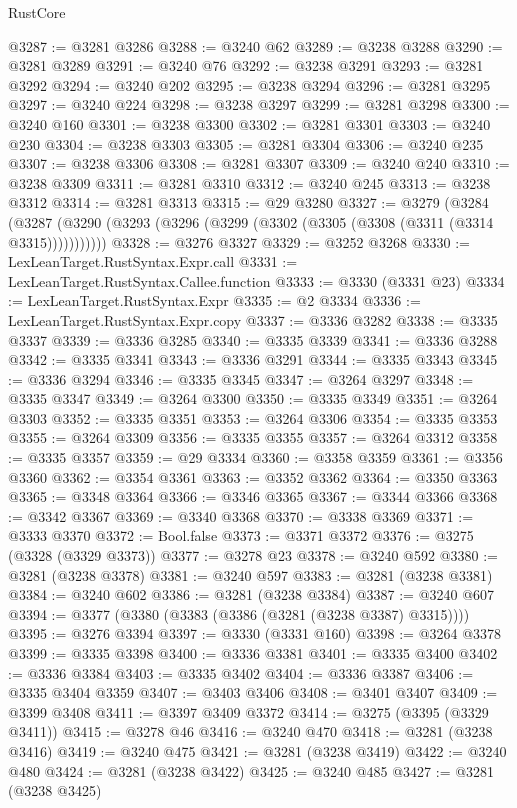 \begin{lexlean}{RustCore}
\begin{coremodule}
@3287 := @3281 @3286
@3288 := @3240 @62
@3289 := @3238 @3288
@3290 := @3281 @3289
@3291 := @3240 @76
@3292 := @3238 @3291
@3293 := @3281 @3292
@3294 := @3240 @202
@3295 := @3238 @3294
@3296 := @3281 @3295
@3297 := @3240 @224
@3298 := @3238 @3297
@3299 := @3281 @3298
@3300 := @3240 @160
@3301 := @3238 @3300
@3302 := @3281 @3301
@3303 := @3240 @230
@3304 := @3238 @3303
@3305 := @3281 @3304
@3306 := @3240 @235
@3307 := @3238 @3306
@3308 := @3281 @3307
@3309 := @3240 @240
@3310 := @3238 @3309
@3311 := @3281 @3310
@3312 := @3240 @245
@3313 := @3238 @3312
@3314 := @3281 @3313
@3315 := @29 @3280
@3327 := @3279
    (@3284 (@3287 (@3290 (@3293 (@3296 (@3299 (@3302 (@3305 (@3308 (@3311 (@3314 @3315)))))))))))
@3328 := @3276 @3327
@3329 := @3252 @3268
@3330 := LexLeanTarget.RustSyntax.Expr.call
@3331 := LexLeanTarget.RustSyntax.Callee.function
@3333 := @3330 (@3331 @23)
@3334 := LexLeanTarget.RustSyntax.Expr
@3335 := @2 @3334
@3336 := LexLeanTarget.RustSyntax.Expr.copy
@3337 := @3336 @3282
@3338 := @3335 @3337
@3339 := @3336 @3285
@3340 := @3335 @3339
@3341 := @3336 @3288
@3342 := @3335 @3341
@3343 := @3336 @3291
@3344 := @3335 @3343
@3345 := @3336 @3294
@3346 := @3335 @3345
@3347 := @3264 @3297
@3348 := @3335 @3347
@3349 := @3264 @3300
@3350 := @3335 @3349
@3351 := @3264 @3303
@3352 := @3335 @3351
@3353 := @3264 @3306
@3354 := @3335 @3353
@3355 := @3264 @3309
@3356 := @3335 @3355
@3357 := @3264 @3312
@3358 := @3335 @3357
@3359 := @29 @3334
@3360 := @3358 @3359
@3361 := @3356 @3360
@3362 := @3354 @3361
@3363 := @3352 @3362
@3364 := @3350 @3363
@3365 := @3348 @3364
@3366 := @3346 @3365
@3367 := @3344 @3366
@3368 := @3342 @3367
@3369 := @3340 @3368
@3370 := @3338 @3369
@3371 := @3333 @3370
@3372 := Bool.false
@3373 := @3371 @3372
@3376 := @3275 (@3328 (@3329 @3373))
@3377 := @3278 @23
@3378 := @3240 @592
@3380 := @3281 (@3238 @3378)
@3381 := @3240 @597
@3383 := @3281 (@3238 @3381)
@3384 := @3240 @602
@3386 := @3281 (@3238 @3384)
@3387 := @3240 @607
@3394 := @3377 (@3380 (@3383 (@3386 (@3281 (@3238 @3387) @3315))))
@3395 := @3276 @3394
@3397 := @3330 (@3331 @160)
@3398 := @3264 @3378
@3399 := @3335 @3398
@3400 := @3336 @3381
@3401 := @3335 @3400
@3402 := @3336 @3384
@3403 := @3335 @3402
@3404 := @3336 @3387
@3406 := @3335 @3404 @3359
@3407 := @3403 @3406
@3408 := @3401 @3407
@3409 := @3399 @3408
@3411 := @3397 @3409 @3372
@3414 := @3275 (@3395 (@3329 @3411))
@3415 := @3278 @46
@3416 := @3240 @470
@3418 := @3281 (@3238 @3416)
@3419 := @3240 @475
@3421 := @3281 (@3238 @3419)
@3422 := @3240 @480
@3424 := @3281 (@3238 @3422)
@3425 := @3240 @485
@3427 := @3281 (@3238 @3425)

\end{coremodule}
\end{lexlean}
